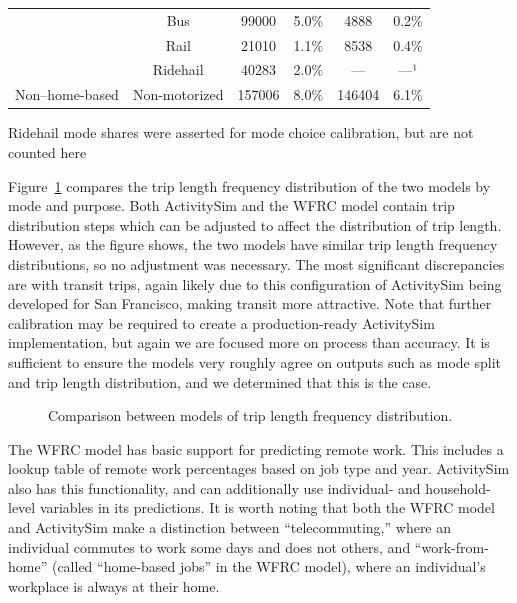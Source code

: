 \documentclass[fancy, twoside, mastersfancy, ms]{byuthesis}
\begin{document}
\begin{table}
{{\begin{threeparttable}
\begin{tabular}[t]{cccccc}
 & Bus & 99000 & 5.0\% & 4888 & 0.2\%\\

 & Rail & 21010 & 1.1\% & 8538 & 0.4\%\\

 & Ridehail & 40283 & 2.0\% & — & —¹\\

\multirow{-6}{*}{\centering\arraybackslash Non–home-based} & Non-motorized & 157006 & 8.0\% & 146404 & 6.1\%\\
\bottomrule
\end{tabular}
\begin{tablenotes}
\item[1] Ridehail mode shares were asserted for mode choice calibration, but are not counted here
\end{tablenotes}
\end{threeparttable}}

}

\end{table}%

Figure~\ref{fig-tlfd-comp} compares the trip length frequency
distribution of the two models by mode and purpose. Both ActivitySim and
the WFRC model contain trip distribution steps which can be adjusted to
affect the distribution of trip length. However, as the figure shows,
the two models have similar trip length frequency distributions, so no
adjustment was necessary. The most significant discrepancies are with
transit trips, again likely due to this configuration of ActivitySim
being developed for San Francisco, making transit more attractive. Note
that further calibration may be required to create a production-ready
ActivitySim implementation, but again we are focused more on process
than accuracy. It is sufficient to ensure the models very roughly agree
on outputs such as mode split and trip length distribution, and we
determined that this is the case.

\begin{figure}


\caption{\label{fig-tlfd-comp}Comparison between models of trip length
frequency distribution.}

\end{figure}%

The WFRC model has basic support for predicting remote work. This
includes a lookup table of remote work percentages based on job type and
year. ActivitySim also has this functionality, and can additionally use
individual- and household-level variables in its predictions. It is
worth noting that both the WFRC model and ActivitySim make a distinction
between ``telecommuting,'' where an individual commutes to work some
days and does not others, and ``work-from-home'' (called ``home-based
jobs'' in the WFRC model), where an individual's workplace is always at
their home.
\end{document}
